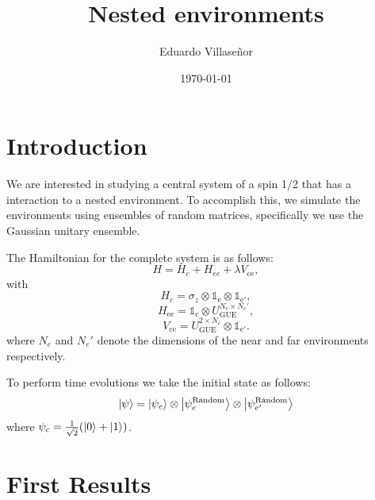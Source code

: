 \documentclass[floatfix]{article}
\title{Nested environments}
\author{Eduardo Villase\~nor}
\date{\today}
\newcommand{\id}{\mathbb{1}}
\begin{document}
\maketitle



\section{Introduction}

We are interested in studying a central system of a spin 1/2 that has a interaction to a nested  
environment. To accomplish this, we simulate the environments using ensembles of random matrices,
specifically we use the Gaussian unitary ensemble.

The Hamiltonian for the complete system is as follows:
\begin{equation}
H=H_c+ H_{ee}+\lambda V_{\text{ce}},
\end{equation}
with
\begin{equation}\label{general_model}
 H_c=\sigma_z \otimes \id_{\text{e}} \otimes \id_{\text{e}'},
\end{equation}
 \begin{equation}
  H_{\text{ee}}=\id_{\text{c}}  \otimes U_{\text{GUE}}^{N_e \times N_e'},
 \end{equation}
 \begin{equation}
V_{\text{ce}}= U_{\text{GUE}}^{2 \times N_e} \otimes \id_{\text{e}'}.
 \end{equation}
where $N_e$ and $N_e'$ denote the dimensions of the near and far environments respectively.

To perform time evolutions we take the initial state as follows:
$$  \Ket{\psi} = \Ket{\psi_c} \otimes \Ket{\psi_e^{\text{Random}}} \otimes \Ket{\psi_{e'}^{\text{Random}}}$$
where $\psi_c = \frac{1}{\sqrt{2}}( \Ket{0} + \Ket{1})$.





\section{First Results}
\end{document}
